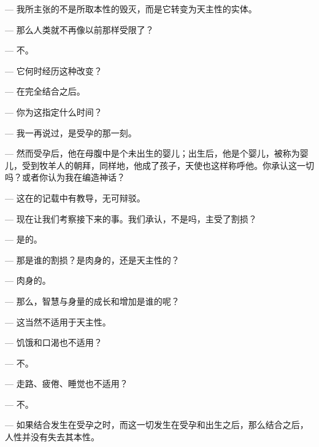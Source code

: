 — 我所主张的不是所取本性的毁灭，而是它转变为天主性的实体。\par

— 那么人类就不再像以前那样受限了？\par

— 不。\par

— 它何时经历这种改变？\par

— 在完全结合之后。\par

— 你为这指定什么时间？\par

— 我一再说过，是受孕的那一刻。\par

— 然而受孕后，他在母腹中是个未出生的婴儿；出生后，他是个婴儿，被称为婴儿，受到牧羊人的朝拜，同样地，他成了孩子，天使也这样称呼他。你承认这一切吗？或者你认为我在编造神话？\par

— 这在的记载中有教导，无可辩驳。\par

— 现在让我们考察接下来的事。我们承认，不是吗，主受了割损？\par

— 是的。\par

— 那是谁的割损？是肉身的，还是天主性的？\par

— 肉身的。\par

— 那么，智慧与身量的成长和增加是谁的呢？\par

— 这当然不适用于天主性。\par

— 饥饿和口渴也不适用？\par

— 不。\par

— 走路、疲倦、睡觉也不适用？\par

— 不。\par

— 如果结合发生在受孕之时，而这一切发生在受孕和出生之后，那么结合之后，人性并没有失去其本性。\par

